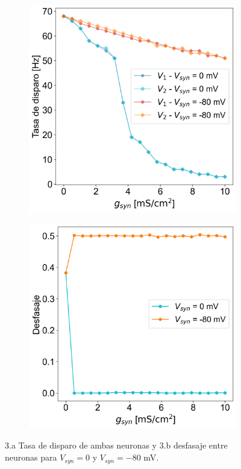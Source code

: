 \documentclass[aps,prb,twocolumn,superscriptaddress,floatfix,longbibliography]{revtex4-2}
\newcounter{para}
\begin{document}
\begin{figure}[h]
   \centering
   \begin{subfigure}[b]{0.45\textwidth}
        \includegraphics[clip=true,width=\columnwidth]{ej1_tasa.png}
        \caption{\label{fig:ej1_tasa}}
   \end{subfigure}
    \begin{subfigure}[b]{0.45\textwidth}
          \includegraphics[clip=true,width=\columnwidth]{ej1_desfasaje.png}
          \caption{\label{fig:ej1_desfasaje}}
    \end{subfigure}
    \caption{3.a Tasa de disparo de ambas neuronas y 3.b desfasaje entre neuronas para $V_{syn} = 0$ y $V_{syn} = -80$ mV.}
    \label{fig:ej1_tasa_desfasaje}
\end{figure}
\end{document}
